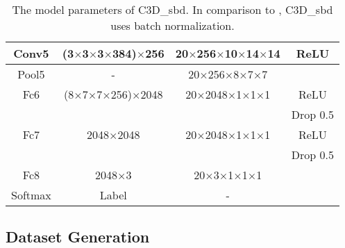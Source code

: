 \documentclass[journal]{IEEEtran}
\begin{document}
\begin{table}
\begin{tabular}{|c|c|c|c|}
Conv5   & (3$\times$3$\times$3$\times$384)$\times$256             & 20$\times$256$\times$10$\times$14$\times$14                 & ReLU                \\ \hline
Pool5   & -                           & 20$\times$256$\times$8$\times$7$\times$7                    &                     \\ \hline
Fc6     & (8$\times$7$\times$7$\times$256)$\times$2048            & 20$\times$2048$\times$1$\times$1$\times$1                   & ReLU                 \\ 
        &                             &                                 & Drop 0.5                 \\ \hline

Fc7     & 2048$\times$2048                   & 20$\times$2048$\times$1$\times$1$\times$1                   & ReLU          \\ 
        &                             &                                 & Drop 0.5                 \\ \hline

Fc8     & 2048$\times$3                      & 20$\times$3$\times$1$\times$1$\times$1                      &                     \\ \hline
Softmax & Label                       & -                               &                     \\ \hline
\end{tabular}\vspace{3pt}
\caption{The model parameters of C3D\_{sbd}. In comparison to \cite{Tran15}, C3D\_{sbd} uses batch normalization. 
}
\label{tab:DeepSBD_Arch}
\end{table}

\subsection{Dataset Generation}\label{Sec:Dataset}
\end{document}

